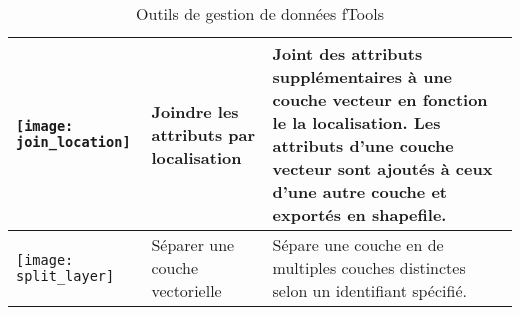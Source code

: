 \begin{table}[ht]
\begin{tabular}{|m{1cm}|m{3cm}|m{9cm}|}
 \hline \texttt{[image: join\_location]} & Joindre les attributs par localisation & Joint des attributs supplémentaires à une couche vecteur en fonction le la localisation. Les attributs d'une couche vecteur sont ajoutés à ceux d'une autre couche et exportés en shapefile. \\
 \hline \texttt{[image: split\_layer]} & Séparer une couche vectorielle & Sépare une couche en de multiples couches distinctes selon un identifiant spécifié. \\
 \hline
\end{tabular}
\caption{Outils de gestion de données fTools}\label{tab:fTool_data_management}
\end{table}